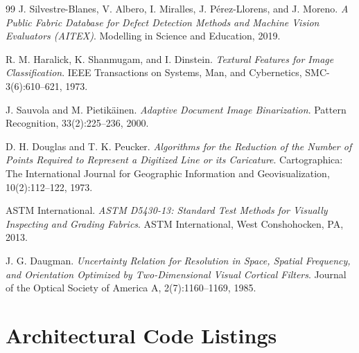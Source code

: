\documentclass[10pt,a4paper]{article}
\begin{document}
\newpage
\begin{thebibliography}{99}
J. Silvestre-Blanes, V. Albero, I. Miralles, J. Pérez-Llorens, and J. Moreno. \textit{A Public Fabric Database for Defect Detection Methods and Machine Vision Evaluators (AITEX)}. Modelling in Science and Education, 2019.

R. M. Haralick, K. Shanmugam, and I. Dinstein. \textit{Textural Features for Image Classification}. IEEE Transactions on Systems, Man, and Cybernetics, SMC-3(6):610--621, 1973.

J. Sauvola and M. Pietikäinen. \textit{Adaptive Document Image Binarization}. Pattern Recognition, 33(2):225--236, 2000.

D. H. Douglas and T. K. Peucker. \textit{Algorithms for the Reduction of the Number of Points Required to Represent a Digitized Line or its Caricature}. Cartographica: The International Journal for Geographic Information and Geovisualization, 10(2):112--122, 1973.

ASTM International. \textit{ASTM D5430-13: Standard Test Methods for Visually Inspecting and Grading Fabrics}. ASTM International, West Conshohocken, PA, 2013.

J. G. Daugman. \textit{Uncertainty Relation for Resolution in Space, Spatial Frequency, and Orientation Optimized by Two-Dimensional Visual Cortical Filters}. Journal of the Optical Society of America A, 2(7):1160--1169, 1985.
\end{thebibliography}

\newpage
\appendix
\section{Architectural Code Listings}
\end{document}
